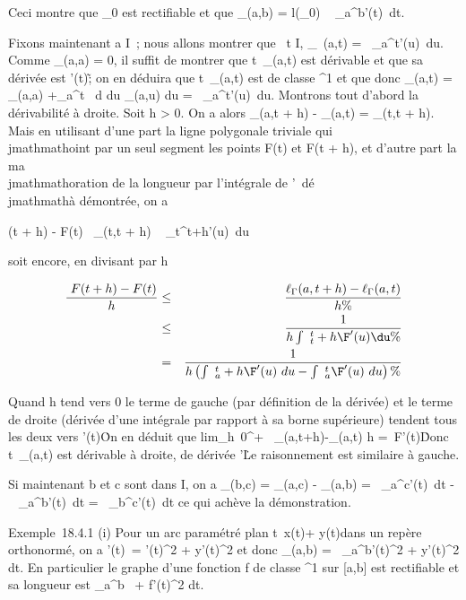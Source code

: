 \documentclass[]{article}
\begin{document}
Ceci montre que \Gamma_0 est rectifiable et que \ell_\Gamma(a,b) =
l(\Gamma_0) \leq\int ~
_a^b\F'(t)\
dt.

Fixons maintenant a \in I~; nous allons montrer que
\forall~t \in I, \ell_\Gamma~(a,t)
=\int ~
_a^t\F'(u)\
du. Comme \ell_\Gamma(a,a) = 0, il suffit de montrer que
t\mapsto~\ell_\Gamma(a,t) est dérivable et que sa
dérivée est \F'(t)\~;
on en déduira que t\mapsto~\ell_\Gamma(a,t) est de
classe \mathcal{C}^1 et que donc \ell_\Gamma(a,t) = \ell_\Gamma(a,a)
+\int  _a^t~ d
\over du \ell_\Gamma(a,u) du
=\int ~
_a^t\F'(u)\
du. Montrons tout d'abord la dérivabilité à droite. Soit h
\textgreater{} 0. On a alors \ell_\Gamma(a,t + h) - \ell_\Gamma(a,t) =
\ell_\Gamma(t,t + h). Mais en utilisant d'une part la ligne polygonale
triviale qui \\jmathmathoint par un seul segment les points F(t) et F(t + h), et
d'autre part la ma\\jmathmathoration de la longueur par l'intégrale de
\F'\ dé\\jmathmathà démontrée,
on a

\F(t + h) - F(t)\ \leq
\ell_\Gamma(t,t + h) \leq\int ~
_t^t+h\F'(u)\
du

soit encore, en divisant par h

\begin{align*} \ F(t + h)
- F(t) \over h & \leq&
\ell_\Gamma(a,t + h) - \ell_\Gamma(a,t) \over h \%&
\\ & \leq& 1 \over h
\int ~
_t^t+h\F'(u)\du
\%& \\ & =& 1 \over
h \left (\int ~
_a^t+h\F'(u)\
du -\int ~
_a^t\F'(u)\
du\right )\%& \\
\end{align*}

Quand h tend vers 0 le terme de gauche (par définition de la dérivée) et
le terme de droite (dérivée d'une intégrale par rapport à sa borne
supérieure) tendent tous les deux vers
\F'(t)\. On en déduit
que lim_h\rightarrow~0^+~
\ell_\Gamma(a,t+h)-\ell_\Gamma(a,t) \over h
='(t)\. Donc
t\mapsto~\ell_\Gamma(a,t) est dérivable à droite,
de dérivée \F'\. Le
raisonnement est similaire à gauche.

Si maintenant b et c sont dans I, on a \ell_\Gamma(b,c) =
\ell_\Gamma(a,c) - \ell_\Gamma(a,b) =\int ~
_a^c\F'(t)\
dt -\int ~
_a^b\F'(t)\
dt =\int ~
_b^c\F'(t)\
dt ce qui achève la démonstration.

Exemple~18.4.1 (i) Pour un arc paramétré plan
t\mapsto~x(t)\vec\imath +
y(t)\vecȷ dans un repère orthonormé, on a
\F'(t)\ =
\sqrtx'(t)^2  + y'(t)^2 et donc
\ell_\Gamma(a,b) =\int ~
_a^b\sqrtx'(t)^2  +
y'(t)^2 dt. En particulier le graphe d'une fonction f de
classe ^1 sur {[}a,b{]} est rectifiable et sa longueur est
\int  _a^b~\sqrt1
+ f'(t)^2 dt.
\end{document}
